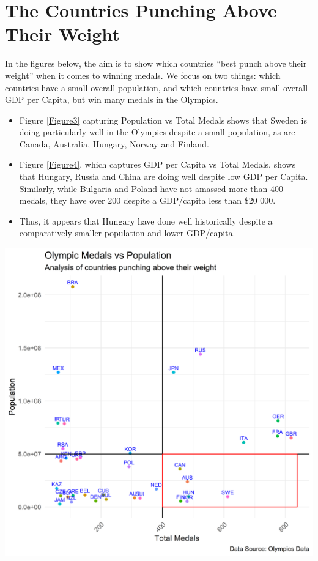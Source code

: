 \documentclass[11pt,preprint, authoryear]{elsarticle}
\let\origfigure\figure
\let\endorigfigure\endfigure
\renewenvironment{figure}[1][2] {
    \expandafter\origfigure\expandafter[H]
} {
    \endorigfigure
}
\numberwithin{equation}{section}
\numberwithin{figure}{section}
\numberwithin{table}{section}
\begin{document}
\newpage

\hypertarget{the-countries-punching-above-their-weight}{%
\section{\texorpdfstring{The Countries Punching Above Their Weight
\label{punching}}{The Countries Punching Above Their Weight }}\label{the-countries-punching-above-their-weight}}

In the figures below, the aim is to show which countries ``best punch
above their weight'' when it comes to winning medals. We focus on two
things: which countries have a small overall population, and which
countries have small overall GDP per Capita, but win many medals in the
Olympics.

\begin{itemize}
\item
  Figure \ref{Figure3} capturing Population vs Total Medals shows that
  Sweden is doing particularly well in the Olympics despite a small
  population, as are Canada, Australia, Hungary, Norway and Finland.
\item
  Figure \ref{Figure4}, which captures GDP per Capita vs Total Medals,
  shows that Hungary, Russia and China are doing well despite low GDP
  per Capita. Similarly, while Bulgaria and Poland have not amassed more
  than 400 medals, they have over 200 despite a GDP/capita less than
  \$20 000.
\item
  Thus, it appears that Hungary have done well historically despite a
  comparatively smaller population and lower GDP/capita.
\end{itemize}

\begin{figure}[H]

{\centering \includegraphics{Question_4_files/figure-latex/Figure3-1} 

}

\caption{Punching above Population Size \label{Figure3}}\label{fig:Figure3}
\end{figure}
\end{document}
